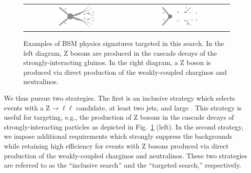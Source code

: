 \begin{figure}[!h]
\begin{center}
\begin{tabular}{cc}
\includegraphics[width=0.4\textwidth]{plots/T5zz.pdf} &
\includegraphics[width=0.4\textwidth]{plots/TChiwz.pdf} \\
\end{tabular}
\caption{
Examples of BSM physics signatures targeted in this search. In the left diagram, Z bosons are produced
in the cascade decays of the strongly-interacting gluinos. In the right diagram, a Z boson is produced
via direct production of the weakly-coupled charginos and neutralinos.
\label{fig:diagrams}
}
\end{center}
\end{figure}

We thus pursue two strategies. The first is an inclusive strategy which selects events with a Z$\to\ell\ell$ candidate,
at least two jets, and large \MET. This strategy is useful for targeting, e.g., the production of Z bosons in the 
cascade decays of strongly-interacting particles as depicted in Fig.~\ref{fig:diagrams} (left). In the second strategy,
we impose additional requirements which strongly suppress the backgrounds while retaining high efficiency for events
with Z bosons produced via direct production of the weakly-coupled charginos and neutralinos. 
These two strategies are referred to as the ``inclusive search'' and the ``targeted search,'' respectively.

